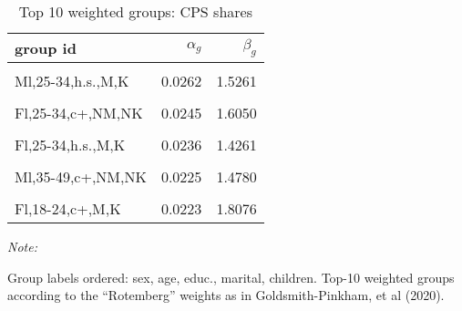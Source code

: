 \begin{table}
\centering
\caption{\label{tab:rotweights:cps}Top 10 weighted groups: CPS shares}
\centering
\begin{threeparttable}
\begin{tabular}[t]{lrr}
\toprule
group id & $\alpha_g$ & $\beta_g$\\
\midrule
\cellcolor{gray!10}{Ml,25-34,c+,M,K} & \cellcolor{gray!10}{0.0302} & \cellcolor{gray!10}{1.5840}\\
\addlinespace
Ml,25-34,h.s.,M,K & 0.0262 & 1.5261\\
\addlinespace
\cellcolor{gray!10}{Fl,35-49,c+,M,K} & \cellcolor{gray!10}{0.0253} & \cellcolor{gray!10}{1.6094}\\
\addlinespace
Fl,25-34,c+,NM,NK & 0.0245 & 1.6050\\
\addlinespace
\cellcolor{gray!10}{Fl,25-34,s.h.s.,M,K} & \cellcolor{gray!10}{0.0241} & \cellcolor{gray!10}{1.7630}\\
\addlinespace
Fl,25-34,h.s.,M,K & 0.0236 & 1.4261\\
\addlinespace
\cellcolor{gray!10}{Ml,25-34,h.s.,M,NK} & \cellcolor{gray!10}{0.0230} & \cellcolor{gray!10}{1.5975}\\
\addlinespace
Ml,35-49,c+,NM,NK & 0.0225 & 1.4780\\
\addlinespace
\cellcolor{gray!10}{Ml,25-34,c+,NM,NK} & \cellcolor{gray!10}{0.0223} & \cellcolor{gray!10}{1.3878}\\
\addlinespace
Fl,18-24,c+,M,K & 0.0223 & 1.8076\\
\bottomrule
\end{tabular}
\begin{tablenotes}
\item \textit{Note: } 
\item Group labels ordered: sex, age, educ., marital, children. Top-10 weighted groups according to the ``Rotemberg'' weights as in Goldsmith-Pinkham, et al (2020).
\end{tablenotes}
\end{threeparttable}
\end{table}
